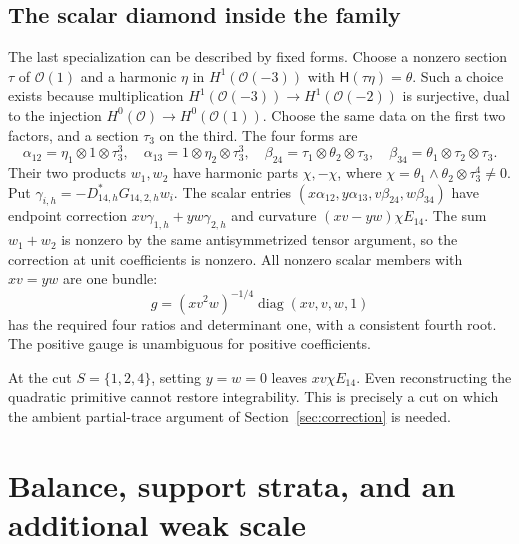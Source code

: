 \documentclass[11pt]{amsart}
\theoremstyle{definition}
\theoremstyle{remark}
\newcommand{\cO}{\mathcal O}
\newcommand{\diag}{\operatorname{diag}}
\newcommand{\HH}{\mathsf H}
\begin{document}
\subsection{The scalar diamond inside the family}
The last specialization can be described by fixed forms. Choose a nonzero
section $\tau$ of $\cO(1)$ and a harmonic $\eta$ in $H^1(\cO(-3))$
with $\HH(\tau\eta)=\theta$. Such a choice exists because multiplication
$H^1(\cO(-3))\to H^1(\cO(-2))$ is surjective, dual to the injection
$H^0(\cO)\to H^0(\cO(1))$. Choose the same data on the first two
factors, and a section $\tau_3$ on the third. The four forms are
\[
 \alpha_{12}=\eta_1\otimes1\otimes\tau_3^3,\quad
 \alpha_{13}=1\otimes\eta_2\otimes\tau_3^3,\quad
 \beta_{24}=\tau_1\otimes\theta_2\otimes\tau_3,\quad
 \beta_{34}=\theta_1\otimes\tau_2\otimes\tau_3.
\]
Their two products $w_1,w_2$ have harmonic parts $\chi,-\chi$, where
$\chi=\theta_1\wedge\theta_2\otimes\tau_3^4\ne0$.
Put $\gamma_{i,h}=-D_{14,h}^*G_{14,2,h}w_i$. The scalar entries
$(x\alpha_{12},y\alpha_{13},v\beta_{24},w\beta_{34})$ have endpoint
correction $xv\gamma_{1,h}+yw\gamma_{2,h}$ and curvature
$(xv-yw)\chi E_{14}$. The sum $w_1+w_2$ is nonzero by the same
antisymmetrized tensor argument, so the correction at unit coefficients
is nonzero. All nonzero scalar members with $xv=yw$ are one bundle:
\[
 g=(xv^2w)^{-1/4}\diag(xv,v,w,1)
\]
has the required four ratios and determinant one, with a consistent fourth
root. The positive gauge is unambiguous for positive coefficients.

At the cut $S=\{1,2,4\}$, setting $y=w=0$ leaves $xv\chi E_{14}$.
Even reconstructing the quadratic primitive cannot restore integrability.
This is precisely a cut on which the ambient partial-trace argument of
Section~\ref{sec:correction} is needed.

\section{Balance, support strata, and an additional weak scale}\label{sec:diamond-scales}
\end{document}
